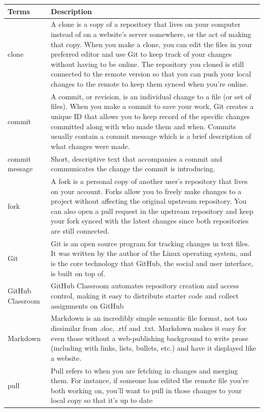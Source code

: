 \documentclass[
]{book}
\begin{document}
\begin{tabular}[t]{l|l}
\hline
Terms & Description\\
\hline
clone & A clone is a copy of a repository that lives on your computer instead of on a website's server somewhere, or the act of making that copy. When you make a clone, you can edit the files in your preferred editor and use Git to keep track of your changes without having to be online. The repository you cloned is still connected to the remote version so that you can push your local changes to the remote to keep them synced when you're online.\\
\hline
commit & A commit, or revision, is an individual change to a file (or set of files). When you make a commit to save your work, Git creates a unique ID that allows you to keep record of the specific changes committed along with who made them and when. Commits usually contain a commit message which is a brief description of what changes were made.\\
\hline
commit message & Short, descriptive text that accompanies a commit and communicates the change the commit is introducing.\\
\hline
fork & A fork is a personal copy of another user's repository that lives on your account. Forks allow you to freely make changes to a project without affecting the original upstream repository. You can also open a pull request in the upstream repository and keep your fork synced with the latest changes since both repositories are still connected.\\
\hline
Git & Git is an open source program for tracking changes in text files. It was written by the author of the Linux operating system, and is the core technology that GitHub, the social and user interface, is built on top of.\\
\hline
GitHub Classroom & GitHub Classroom automates repository creation and access control, making it easy to distribute starter code and collect assignments on GitHub\\
\hline
Markdown & Markdown is an incredibly simple semantic file format, not too dissimilar from .doc, .rtf and .txt. Markdown makes it easy for even those without a web-publishing background to write prose (including with links, lists, bullets, etc.) and have it displayed like a website.\\
\hline
pull & Pull refers to when you are fetching in changes and merging them. For instance, if someone has edited the remote file you're both working on, you'll want to pull in those changes to your local copy so that it's up to date\\

\end{tabular}
\end{document}
